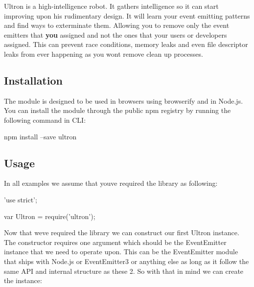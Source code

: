 \href{http://unshift.io}{\tt }\href{http://browsenpm.org/package/ultron}{\tt }\href{https://travis-ci.org/unshiftio/ultron}{\tt }\href{https://david-dm.org/unshiftio/ultron}{\tt }\href{https://coveralls.io/r/unshiftio/ultron?branch=master}{\tt }\href{http://webchat.freenode.net/?channels=unshift}{\tt }

Ultron is a high-\/intelligence robot. It gathers intelligence so it can start improving upon his rudimentary design. It will learn your event emitting patterns and find ways to exterminate them. Allowing you to remove only the event emitters that {\bfseries you} assigned and not the ones that your users or developers assigned. This can prevent race conditions, memory leaks and even file descriptor leaks from ever happening as you won\textquotesingle{}t remove clean up processes.

\subsection*{Installation}

The module is designed to be used in browsers using browserify and in Node.\+js. You can install the module through the public npm registry by running the following command in C\+LI\+:


\begin{DoxyCode}
npm install --save ultron
\end{DoxyCode}


\subsection*{Usage}

In all examples we assume that you\textquotesingle{}ve required the library as following\+:


\begin{DoxyCode}
'use strict';

var Ultron = require('ultron');
\end{DoxyCode}


Now that we\textquotesingle{}ve required the library we can construct our first {\ttfamily Ultron} instance. The constructor requires one argument which should be the {\ttfamily Event\+Emitter} instance that we need to operate upon. This can be the {\ttfamily Event\+Emitter} module that ships with Node.\+js or {\ttfamily Event\+Emitter3} or anything else as long as it follow the same A\+PI and internal structure as these 2. So with that in mind we can create the instance\+:


